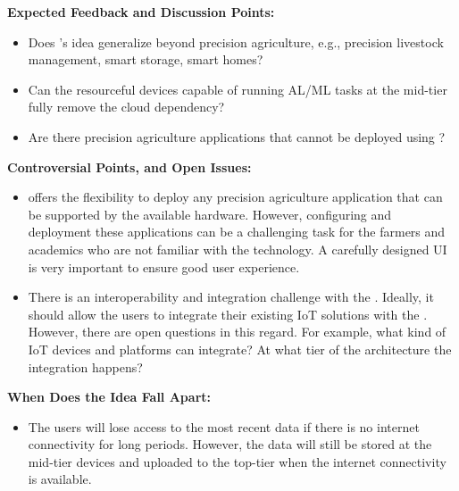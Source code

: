 \noindent
\textbf{Expected Feedback and Discussion Points:}
\begin{itemize}
    \item Does \myname's idea generalize beyond precision agriculture, e.g., precision livestock management, smart storage, smart homes?
    \item Can the resourceful devices capable of running AL/ML tasks at the mid-tier fully remove the cloud dependency?
    \item Are there precision agriculture applications that cannot be deployed using \myname{}?
\end{itemize}

\noindent
\textbf{Controversial Points, and Open Issues:}
\begin{itemize}
    \item \myname offers the flexibility to deploy any precision agriculture application that can be supported by the available hardware. However, configuring and deployment these applications can be a challenging task for the farmers and academics who are not familiar with the technology. A carefully designed UI is very important to ensure good user experience. 
    \item There is an interoperability and integration challenge with the \myname. Ideally, it should allow the users to integrate their existing IoT solutions with the \myname. However, there are open questions in this regard. For example, what kind of IoT devices and platforms can integrate? At what tier of the architecture the integration happens? 
\end{itemize}

\noindent
\textbf{When Does the Idea Fall Apart:}
\begin{itemize}
    \item The users will lose access to the most recent data if there is no internet connectivity for long periods. However, the data will still be stored at the mid-tier devices and uploaded to the top-tier when the internet connectivity is available. 
\end{itemize}